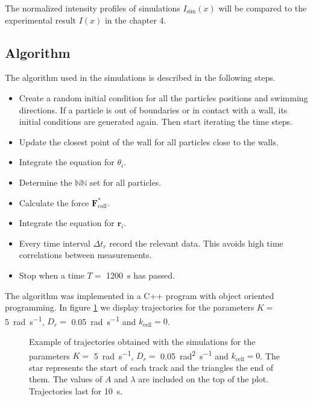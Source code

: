 The normalized intensity profiles of simulations $I_{\text{sim}}(x) $ will be compared to the experimental result $I(x)$ in the chapter 4.

\newpage

\subsection{Algorithm}

The algorithm used in the simulations is described in the following steps.

\begin{itemize}
    \item[1.] Create a random initial condition for all the particles positions and swimming directions. If a particle is out of boundaries or in contact with a wall, its initial conditions are generated again. Then start iterating the time steps.
    \item[2.] Update the closest point of the wall for all particles close to the walls.
    \item[3.] Integrate the equation for $\theta_i$.
    \item[4.] Determine the $\mathbb{NN}$ set for all particles.
    \item[5.] Calculate the force $\textbf{F}^*_{\text{coll}}$.
    \item[6.] Integrate the equation for $\textbf{r}_i$.
    \item[7.] Every time interval $\Delta t_r$ record the relevant data. This avoids high time correlations between measurements.
    \item[8.] Stop when a time $T=$ \SI{1200}{\second} has passed.
\end{itemize}

The algorithm was implemented in a C++ program with object oriented programming. In figure \ref{sim trajectories} we display trajectories for the parameters $K=$ \SI[per-mode = symbol]{5}{\radian\per\second}, $D_r=$ \SI[per-mode = symbol]{0.05}{\radian\per\second} and $k_{\text{cell}}=0$.

\begin{figure}[H]
	\centering
	
	\caption[Example of trajectories for the simulations]{Example of trajectories  obtained with the simulations for the parameters $K=$ \SI[per-mode = symbol]{5}{\radian\per\second}, $D_r=$ \SI[per-mode = symbol]{0.05}{\square\radian\per\second} and $k_{\text{cell}}=0$. The star represents the start of each track and the triangles the end of them. The values of $A$ and $\lambda$ are included on the top of the plot. Trajectories last for \SI{10}{\second}.}
	\label{sim trajectories}
\end{figure}
